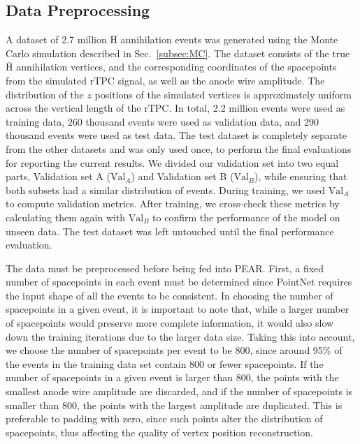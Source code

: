 \documentclass[a4paper,11pt]{article}
\begin{document}
\subsection{\label{subsec:preproc}Data Preprocessing}
A dataset of 2.7 million $\overline{\mathrm{H}}$ annihilation events was generated using the Monte Carlo simulation described in Sec.~\ref{subsec:MC}. The dataset consists of the true $\overline{\mathrm{H}}$ annihilation vertices, and the corresponding coordinates of the spacepoints from the simulated rTPC signal, as well as the anode wire amplitude. The distribution of the $z$ positions of the simulated vertices is approximately uniform across the vertical length of the rTPC. In total, 2.2 million events were used as training data, 260 thousand events were used as validation data, and 290 thousand events were used as test data. The test dataset is completely separate from the other datasets and was only used once, to perform the final evaluations for reporting the current results. We divided our validation set into two equal parts, Validation set A ($\mathrm{Val}_{A}$) and Validation set B ($\mathrm{Val}_{B}$), while ensuring that both subsets had a similar distribution of events. During training, we used $\mathrm{Val}_{A}$ to compute validation metrics. After training, we cross-check these metrics by calculating them again with $\mathrm{Val}_{B}$ to confirm the performance of the model on unseen data. The test dataset was left untouched until the final performance evaluation.

The data must be preprocessed before being fed into PEAR. First, a fixed number of spacepoints in each event must be determined since PointNet requires the input shape of all the events to be consistent. In choosing the number of spacepoints in a given event, it is important to note that, while a larger number of spacepoints would preserve more complete information, it would also slow down the training iterations due to the larger data size. 
Taking this into account, we choose the number of spacepoints per event to be 800, since around 95\% of the events in the training data set contain 800 or fewer spacepoints.%
If the number of spacepoints in a given event is larger than 800, the points with the smallest anode wire amplitude are discarded, and if the number of spacepoints is smaller than 800, the points with the largest amplitude are duplicated. This is preferable to padding with zero, since such points alter the distribution of spacepoints, thus affecting the quality of vertex position reconstruction.
\end{document}
